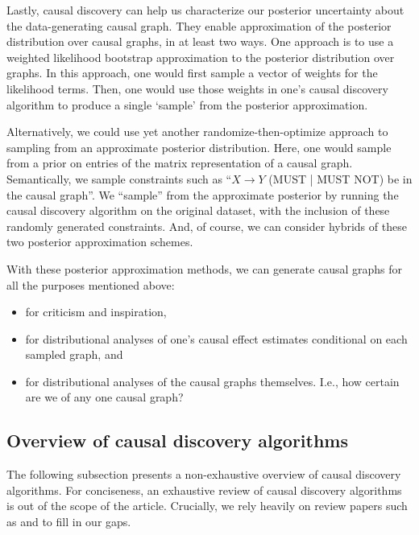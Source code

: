 Lastly, causal discovery can help us characterize our posterior uncertainty about the data-generating causal graph.
They enable approximation of the posterior distribution over causal graphs, in at least two ways.
One approach is to use a weighted likelihood bootstrap approximation \citep{newton_1994_approximate} to the posterior distribution over graphs.
In this approach, one would first sample a vector of weights for the likelihood terms.
Then, one would use those weights in one's causal discovery algorithm to produce a single `sample' from the posterior approximation.

Alternatively, we could use yet another randomize-then-optimize \citep{bardsley_2014_randomize, orabona_2014_measure} approach to sampling from an approximate posterior distribution.
Here, one would sample from a prior on entries of the matrix representation of a causal graph.
Semantically, we sample constraints such as ``$X \rightarrow Y$ (MUST | MUST NOT) be in the causal graph''.
We ``sample'' from the approximate posterior by running the causal discovery algorithm on the original dataset, with the inclusion of these randomly generated constraints.
And, of course, we can consider hybrids of these two posterior approximation schemes.

With these posterior approximation methods, we can generate causal graphs for all the purposes mentioned above:
\begin{itemize}
   \item for criticism and inspiration,
   \item for distributional analyses of one's causal effect estimates conditional on each sampled graph, and
   \item for distributional analyses of the causal graphs themselves.
   \newline
   I.e., how certain are we of any one causal graph?
\end{itemize}

\subsection{Overview of causal discovery algorithms}

The following subsection presents a non-exhaustive overview of causal discovery algorithms.
For conciseness, an exhaustive review of causal discovery algorithms is out of the scope of the article.
Crucially, we rely heavily on review papers such as \citet{glymour_2019_review} and \citet{spirtes_2016_causal} to fill in our gaps.


